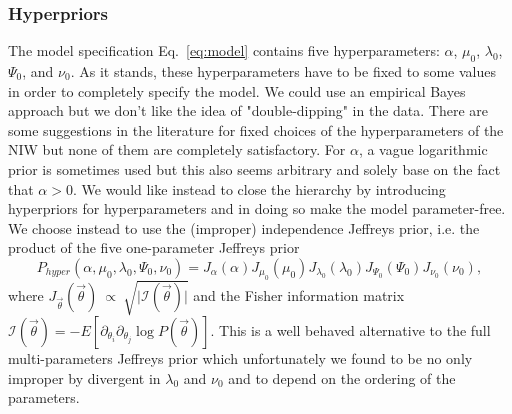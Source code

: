 \documentclass[11pt, oneside]{article}   	%
\begin{document}
\subsubsection{Hyperpriors}
The model specification Eq.~\ref{eq:model} contains five hyperparameters: $\alpha$, $\mu_0$, $\lambda_0$, $\Psi_0$, and $\nu_0$. As it stands, these hyperparameters have to be fixed to some values in order to completely specify the model. We could use an empirical Bayes approach but we don't like the idea of "double-dipping" in the data. There are some suggestions in the literature for fixed choices of the hyperparameters of the NIW but none of them are completely satisfactory. For $\alpha$, a vague logarithmic prior is sometimes used but this also seems arbitrary and solely base on the fact that $\alpha > 0$. We would like instead to close the hierarchy by introducing hyperpriors for hyperparameters and in doing so make the model parameter-free. We choose instead to use the (improper) independence Jeffreys prior, i.e. the product of the five one-parameter Jeffreys prior
$$P_{hyper}(\alpha,\mu_0,\lambda_0,\Psi_0,\nu_0)=J_\alpha (\alpha) J_{\mu_0}(\mu_0) J_{\lambda_0}(\lambda_0) J_{\Psi_0}(\Psi_0) J_{\nu_0}(\nu_0),$$
where $J_{\vec \theta}(\vec \theta)~\propto~\sqrt{\vert\mathcal I(\vec \theta)\vert}$ and the Fisher information matrix $\mathcal I(\vec\theta) = -E[\partial_{\theta_i}\partial_{\theta_j} \log P(\vec\theta)]$. This is a well behaved alternative to the full multi-parameters Jeffreys prior which unfortunately we found to be no only improper by divergent in $\lambda_0$ and $\nu_0$ and to depend on the ordering of the parameters.
\end{document}
